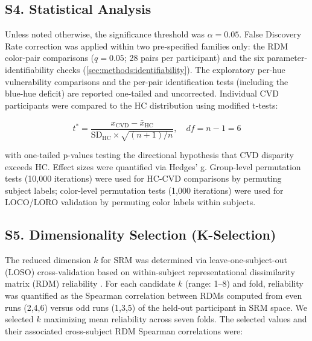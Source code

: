 
\subsection*{\textbf{S4. Statistical Analysis}}

Unless noted otherwise, the significance threshold was $\alpha = 0.05$. False Discovery Rate correction \cite{benjamini1995} was applied within two pre-specified families only: the RDM color-pair comparisons ($q = 0.05$; 28 pairs per participant) and the six parameter-identifiability checks (\cref{sec:methods:identifiability}). The exploratory per-hue vulnerability comparisons and the per-pair identification tests (including the blue-hue deficit) are reported one-tailed and uncorrected.
Individual CVD participants were compared to the HC distribution using  modified t-tests:

\begin{equation}
t^* = \frac{x_{\text{CVD}} - \bar{x}_{\text{HC}}}{\text{SD}_{\text{HC}} \times \sqrt{(n+1)/n}}, \quad df = n-1 = 6
\end{equation}

with one-tailed p-values testing the directional hypothesis that CVD disparity exceeds HC.
Effect sizes were quantified via Hedges' g.
Group-level permutation tests (10,000 iterations) were used for HC-CVD comparisons by permuting subject labels; color-level permutation tests (1,000 iterations) were used for LOCO/LORO validation by permuting color labels within subjects.




\subsection*{\textbf{S5. Dimensionality Selection (K-Selection)}}

The reduced dimension $k$ for SRM was determined via leave-one-subject-out (LOSO) cross-validation based on within-subject representational dissimilarity matrix (RDM) reliability \cite{cunningham2014}.
For each candidate $k$ (range: 1--8) and fold, reliability was quantified as the Spearman correlation between RDMs computed from even runs (2,4,6) versus odd runs (1,3,5) of the held-out participant in SRM space.
We selected $k$ maximizing mean reliability across seven folds.
The selected values and their associated cross-subject RDM Spearman correlations were:

